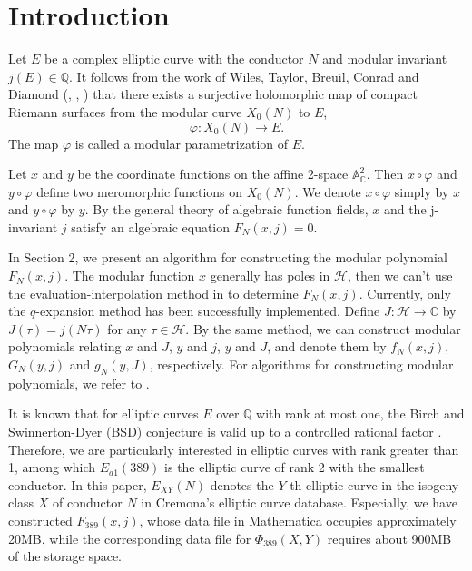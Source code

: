 \documentclass[10pt, a4paper]{article}
\begin{document}
\section{Introduction}
Let \( E \) be a complex elliptic curve with the conductor \( N \) and modular invariant \( j(E) \in \mathbb{Q} \).
It follows from the work of Wiles, Taylor, Breuil, Conrad and Diamond (\cite{Wiles}, \cite{Taylor-Wiles}, \cite{Breuil-Conrad-Diamond-Taylor}) that  there exists a surjective holomorphic map of compact Riemann surfaces from  the modular curve  \(X_0(N)\) to $E$,
\[\varphi: X_0(N) \to E.\]
 The map \(\varphi\) is called a  modular parametrization of \(E\).

Let \(x\) and \(y\) be the coordinate functions on the affine 2-space \(\mathbb{A}^2_{\mathbb{C}}\). Then \(x \circ \varphi\) and \(y \circ \varphi\) define two meromorphic functions on \(X_0(N)\). We denote \(x \circ \varphi\) simply by \(x\) and \(y \circ \varphi\) by \(y\). By the general theory of algebraic function fields, $x$ and the j-invariant $j$ satisfy an algebraic equation \(F_N(x,j) = 0\).

In Section 2, we present an algorithm for constructing the modular polynomial \(F_N(x,j)\). 
The modular function $x$ generally has  poles in $\mathcal{H}$, then we can't use  the evaluation-interpolation method  in \cite{Enge} to determine $F_N(x, j)$.   Currently, only the $q$-expansion method has been successfully implemented.
Define \( J: \mathcal{H} \to \mathbb{C} \) by \( J(\tau) = j(N\tau) \) for any \(\tau \in \mathcal{H}\).
By the same method, we can construct modular polynomials relating \( x \) and \( J \),
\( y \) and \( j \), \( y \) and \( J \), and denote  them  by \( f_N(x,j) \), \( G_N(y,j) \) and \( g_N(y,J) \), respectively.
 For algorithms for constructing modular polynomials, we refer to \cite{Bruinier-Ono-Sutherland,Enge}.

It is known that for elliptic curves \( E \) over $\mathbb{Q}$ with rank at most one, the Birch and Swinnerton-Dyer (BSD) conjecture is valid up to a controlled rational factor \cite{Cohen1}. Therefore, we are particularly interested in elliptic curves with rank greater than 1, among  which \( E_{a1}(389) \)   is  the elliptic curve  of  rank 2 with the smallest conductor.
In this paper, \( E_{XY}(N) \) denotes the \( Y \)-th elliptic curve in the isogeny class \( X \) of conductor \( N \)  in Cremona's elliptic curve database\cite{Cremona}.   Especially,  we have   constructed  \( F_{389}(x, j) \), whose data file in Mathematica occupies approximately 20MB, while the corresponding data file for \( \Phi_{389}(X, Y) \) requires about 900MB of the storage space.
\end{document}
